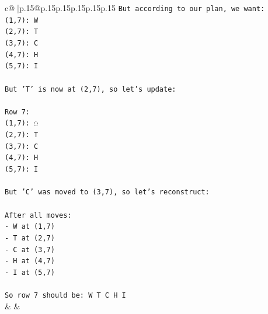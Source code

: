 \documentclass{article}
\begin{document}
{\begin{supertabular}{c@{$\;$}|p{.15\linewidth}@{}p{.15\linewidth}p{.15\linewidth}p{.15\linewidth}p{.15\linewidth}p{.15\linewidth}}
{{{\texttt{But according to our plan, we want:} \\
\texttt{(1,7): W} \\
\texttt{(2,7): T} \\
\texttt{(3,7): C} \\
\texttt{(4,7): H} \\
\texttt{(5,7): I} \\
\\ 
\texttt{But 'T' is now at (2,7), so let's update:} \\
\\ 
\texttt{Row 7:} \\
\texttt{(1,7): ◌} \\
\texttt{(2,7): T} \\
\texttt{(3,7): C} \\
\texttt{(4,7): H} \\
\texttt{(5,7): I} \\
\\ 
\texttt{But 'C' was moved to (3,7), so let's reconstruct:} \\
\\ 
\texttt{After all moves:} \\
\texttt{{-} W at (1,7)} \\
\texttt{{-} T at (2,7)} \\
\texttt{{-} C at (3,7)} \\
\texttt{{-} H at (4,7)} \\
\texttt{{-} I at (5,7)} \\
\\ 
\texttt{So row 7 should be: W T C H I} \\
            }
        }
    }
    & & \\ \\


\end{supertabular}}
\end{document}
